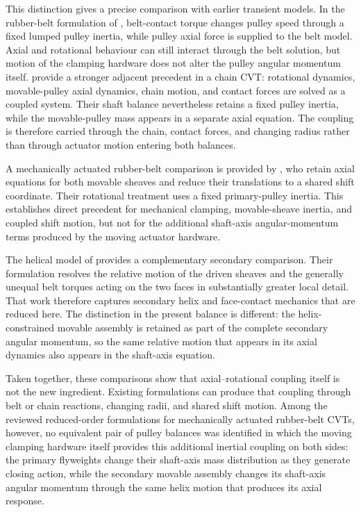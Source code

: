 \documentclass[11pt]{report}
\numberwithin{equation}{section}
\begin{document}
This distinction gives a precise comparison with earlier transient models.
In the rubber-belt formulation of \citet{Ballew2015}, belt-contact torque
changes pulley speed through a fixed lumped pulley inertia, while pulley axial
force is supplied to the belt model. Axial and rotational behaviour can still
interact through the belt solution, but motion of the clamping hardware does
not alter the pulley angular momentum itself. \citet{DuanEtAl2016} provide a
stronger adjacent precedent in a chain CVT: rotational dynamics, movable-pulley
axial dynamics, chain motion, and contact forces are solved as a coupled
system. Their shaft balance nevertheless retains a fixed pulley inertia, while
the movable-pulley mass appears in a separate axial equation. The coupling is
therefore carried through the chain, contact forces, and changing radius rather
than through actuator motion entering both balances.

A mechanically actuated rubber-belt comparison is provided by
\citet{SilvaEtAl2023}, who retain axial equations for both movable sheaves and
reduce their translations to a shared shift coordinate. Their rotational
treatment uses a fixed primary-pulley inertia. This establishes direct
precedent for mechanical clamping, movable-sheave inertia, and coupled shift
motion, but not for the additional shaft-axis angular-momentum terms produced
by the moving actuator hardware.

The helical model of \citet{SorgeCammalleri2011} provides a complementary
secondary comparison. Their formulation resolves the relative motion of the
driven sheaves and the generally unequal belt torques acting on the two faces
in substantially greater local detail. That work therefore captures secondary
helix and face-contact mechanics that are reduced here. The distinction in the
present balance is different: the helix-constrained movable assembly is
retained as part of the complete secondary angular momentum, so the same
relative motion that appears in its axial dynamics also appears in the
shaft-axis equation.

Taken together, these comparisons show that axial--rotational coupling itself
is not the new ingredient. Existing formulations can produce that coupling
through belt or chain reactions, changing radii, and shared shift motion. Among
the reviewed reduced-order formulations for mechanically actuated rubber-belt
CVTs, however, no equivalent pair of pulley balances was identified in which
the moving clamping hardware itself provides this additional inertial coupling
on both sides: the primary flyweights change their shaft-axis mass distribution
as they generate closing action, while the secondary movable assembly changes
its shaft-axis angular momentum through the same helix motion that produces
its axial response.
\end{document}
